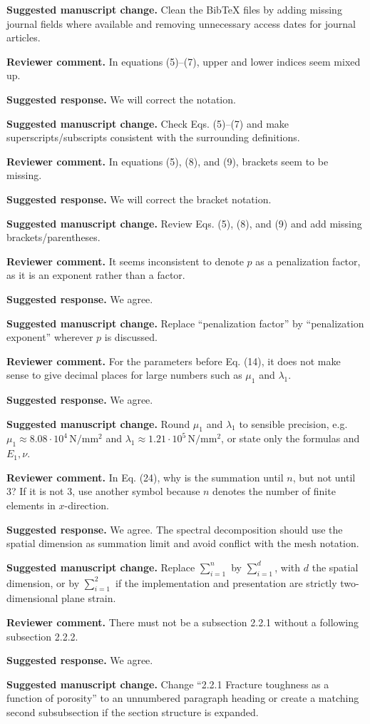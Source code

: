 \documentclass[11pt,a4paper]{article}
\newcommand{\comment}[1]{\par\noindent\textbf{Reviewer comment.} #1\par}
\newcommand{\response}[1]{\par\noindent\textbf{Suggested response.} #1\par}
\newcommand{\change}[1]{\par\noindent\textbf{Suggested manuscript change.} #1\par}
\begin{document}
\change{Clean the BibTeX files by adding missing journal fields where
available and removing unnecessary access dates for journal articles.}

\comment{In equations (5)--(7), upper and lower indices seem mixed up.}

\response{We will correct the notation.}

\change{Check Eqs. (5)--(7) and make superscripts/subscripts consistent with
the surrounding definitions.}

\comment{In equations (5), (8), and (9), brackets seem to be missing.}

\response{We will correct the bracket notation.}

\change{Review Eqs. (5), (8), and (9) and add missing brackets/parentheses.}

\comment{It seems inconsistent to denote \(p\) as a penalization factor, as it
is an exponent rather than a factor.}

\response{We agree.}

\change{Replace ``penalization factor'' by ``penalization exponent'' wherever
\(p\) is discussed.}

\comment{For the parameters before Eq. (14), it does not make sense to give
decimal places for large numbers such as \(\mu_1\) and \(\lambda_1\).}

\response{We agree.}

\change{Round \(\mu_1\) and \(\lambda_1\) to sensible precision, e.g.
\(\mu_1\approx 8.08\cdot10^4\,\mathrm{N/mm^2}\) and
\(\lambda_1\approx 1.21\cdot10^5\,\mathrm{N/mm^2}\), or state only the
formulas and \(E_1,\nu\).}

\comment{In Eq. (24), why is the summation until \(n\), but not until 3? If it
is not 3, use another symbol because \(n\) denotes the number of finite
elements in \(x\)-direction.}

\response{We agree. The spectral decomposition should use the spatial
dimension as summation limit and avoid conflict with the mesh notation.}

\change{Replace \(\sum_{i=1}^{n}\) by \(\sum_{i=1}^{d}\), with \(d\) the
spatial dimension, or by \(\sum_{i=1}^{2}\) if the implementation and
presentation are strictly two-dimensional plane strain.}

\comment{There must not be a subsection 2.2.1 without a following subsection
2.2.2.}

\response{We agree.}

\change{Change ``2.2.1 Fracture toughness as a function of porosity'' to an
unnumbered paragraph heading or create a matching second subsubsection if the
section structure is expanded.}
\end{document}
